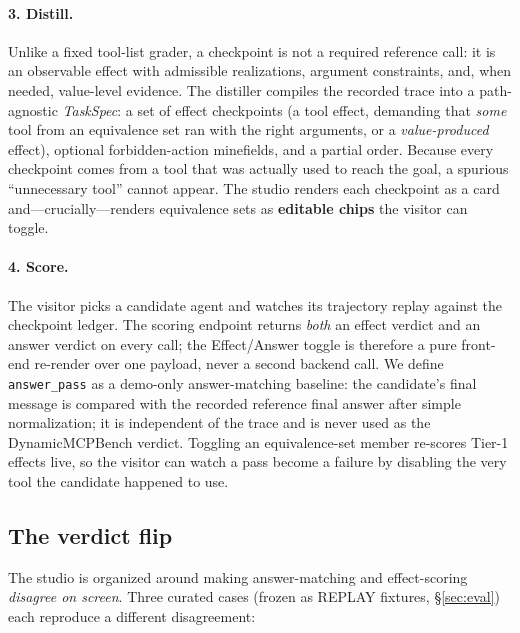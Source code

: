 \paragraph{3. Distill.} Unlike a fixed tool-list grader, a checkpoint is not a
required reference call: it is an observable effect with admissible
realizations, argument constraints, and, when needed, value-level evidence. The
distiller compiles the recorded trace into a path-agnostic \emph{TaskSpec}: a
set of effect checkpoints (a tool effect, demanding that \emph{some} tool from
an equivalence set ran with the right arguments, or a \emph{value-produced}
effect), optional forbidden-action minefields, and a partial order. Because
every checkpoint comes from a tool that was actually used to reach the goal, a
spurious ``unnecessary tool'' cannot appear. The studio renders each checkpoint
as a card and---crucially---renders equivalence sets as \textbf{editable chips}
the visitor can toggle.

\paragraph{4. Score.} The visitor picks a candidate agent and watches its
trajectory replay against the checkpoint ledger. The scoring endpoint returns
\emph{both} an effect verdict and an answer verdict on every call; the
Effect/Answer toggle is therefore a pure front-end re-render over one payload,
never a second backend call. We define \texttt{answer\_pass} as a demo-only
answer-matching baseline: the candidate's final message is compared with the
recorded reference final answer after simple normalization; it is independent of
the trace and is never used as the DynamicMCPBench verdict. Toggling an
equivalence-set member re-scores Tier-1 effects live, so the visitor can watch a
pass become a failure by disabling the very tool the candidate happened to use.

\subsection{The verdict flip}

The studio is organized around making answer-matching and effect-scoring
\emph{disagree on screen}. Three curated cases (frozen as REPLAY fixtures,
\S\ref{sec:eval}) each reproduce a different disagreement:


